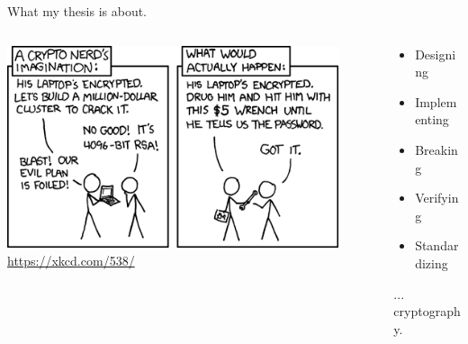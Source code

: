 \documentclass[usenames,dvipsnames,10pt,aspectratio=169]{beamer}
\begin{document}
\begin{frame}{What my thesis is about.}
	\Large
	\vspace{1cm}
	\begin{columns}
		\begin{column}{0.6\textwidth}
			\vspace{1cm}

			\includegraphics[width=0.9\textwidth]{graphics/security.png}
			\small
			\url{https://xkcd.com/538/}
		\end{column}
		\begin{column}{0.45\textwidth}
			\begin{itemize}
				\item Designing
				\item Implementing
				\item Breaking
				\item Verifying
				\item Standardizing
			\end{itemize}
			\vspace{0.25cm}
			\hspace{1cm} ... cryptography.
		\end{column}
	\end{columns}
\end{frame}


\end{document}
